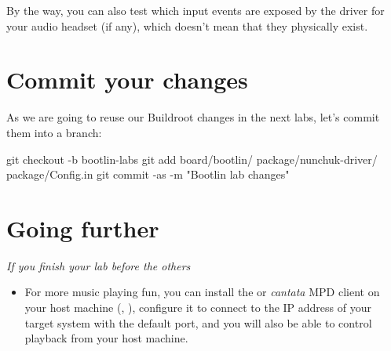By the way, you can also test which input events are exposed by the
driver for your audio headset (if any), which doesn't mean that they physically
exist.

\section{Commit your changes}

As we are going to reuse our Buildroot changes in the next labs,
let's commit them into a branch:

\begin{bashinput}
git checkout -b bootlin-labs
git add board/bootlin/ package/nunchuk-driver/ package/Config.in
git commit -as -m "Bootlin lab changes"
\end{bashinput}

\section{Going further}

{\em If you finish your lab before the others}

\begin{itemize}
\item For more music playing fun, you can install the  or
  {\em cantata} MPD client on your host machine (, ), configure it to
  connect to the IP address of your target system with the default
  port, and you will also be able to control playback from your host
  machine.
\end{itemize}

